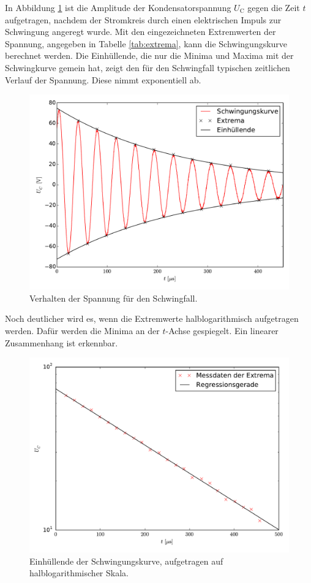 In Abbildung \ref{schwingfall} ist die Amplitude der Kondensatorspannung $U_\mathup{C}$ gegen die Zeit $t$ aufgetragen, nachdem der Stromkreis durch einen elektrischen Impuls zur Schwingung angeregt wurde.
Mit den eingezeichneten Extremwerten der Spannung, angegeben in Tabelle \ref{tab:extrema}, kann die Schwingungskurve berechnet werden.
Die Einhüllende, die nur die Minima und Maxima mit der Schwingkurve gemein hat, zeigt den für den Schwingfall typischen zeitlichen Verlauf der Spannung. 
Diese nimmt exponentiell ab.
\begin{figure}[h]
		\centering
		\includegraphics[width=\textwidth]{build/plot_schwingungskurve.pdf}
		\caption{Verhalten der Spannung für den Schwingfall. \cite{matplotlib}}
\label{schwingfall}
\end{figure}
Noch deutlicher wird es, wenn die Extremwerte halblogarithmisch aufgetragen werden. Dafür werden die Minima an der $t$-Achse gespiegelt. Ein linearer Zusammenhang ist erkennbar.
\begin{figure}[h]
		\centering
		\includegraphics[width=\textwidth]{build/plot_einhuellende_semilog.pdf}
		\caption{Einhüllende der Schwingungskurve, aufgetragen auf halblogarithmischer Skala. \cite{matplotlib}}
\end{figure}
